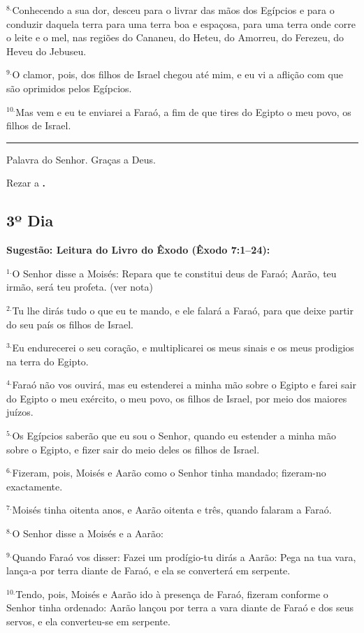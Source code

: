 \documentclass[a4paper,14pt]{extarticle} \usepackage[utf8]{inputenc}
\begin{document}
$^{8.}$Conhecendo a sua dor, desceu para o livrar das mãos dos Egípcios e para o conduzir daquela terra para uma terra boa e espaçosa, para uma terra onde corre o leite e o mel, nas regiões do Cananeu, do Heteu, do Amorreu, do Ferezeu, do Heveu do Jebuseu.

$^{9.}$O clamor, pois, dos filhos de Israel chegou até mim, e eu vi a aflição com que são oprimidos pelos Egípcios.

$^{10.}$Mas vem e eu te enviarei a Faraó, a fim de que tires do Egipto o meu povo, os filhos de Israel.


\par\noindent\rule{\textwidth}{0.4pt}

Palavra do Senhor. Graças a Deus.

Rezar a \textbf{.}
\subsection{3º Dia}
\textbf{Sugestão: Leitura do Livro do Êxodo (Êxodo 7:1–24):}

$^{1.}$O Senhor disse a Moisés: Repara que te constitui deus de Faraó; Aarão, teu irmão, será teu profeta. (ver nota)

$^{2.}$Tu lhe dirás tudo o que eu te mando, e ele falará a Faraó, para que deixe partir do seu país os filhos de Israel.

$^{3.}$Eu endurecerei o seu coração, e multiplicarei os meus sinais e os meus prodigios na terra do Egipto.

$^{4.}$Faraó não vos ouvirá, mas eu estenderei a minha mão sobre o Egipto e farei sair do Egipto o meu exército, o meu povo, os filhos de Israel, por meio dos maiores juízos.

$^{5.}$Os Egípcios saberão que eu sou o Senhor, quando eu estender a minha mão sobre o Egipto, e fizer sair do meio deles os filhos de Israel.

$^{6.}$Fizeram, pois, Moisés e Aarão como o Senhor tinha mandado; fizeram-no exactamente.

$^{7.}$Moisés tinha oitenta anos, e Aarão oitenta e três, quando falaram a Faraó.

$^{8.}$O Senhor disse a Moisés e a Aarão:

$^{9.}$Quando Faraó vos disser: Fazei um prodígio-tu dirás a Aarão: Pega na tua vara, lança-a por terra diante de Faraó, e ela se converterá em serpente.

$^{10.}$Tendo, pois, Moisés e Aarão ido à presença de Faraó, fizeram conforme o Senhor tinha ordenado: Aarão lançou por terra a vara diante de Faraó e dos seus servos, e ela converteu-se em serpente.
\end{document}
